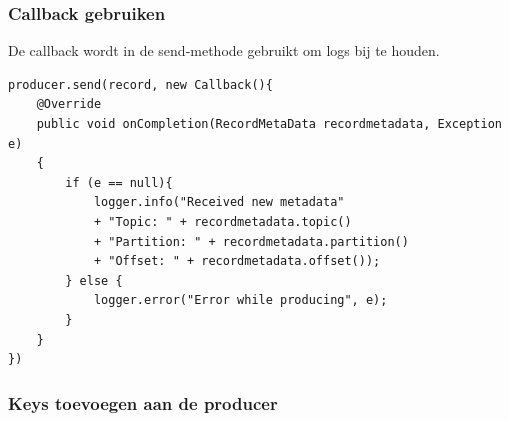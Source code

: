 \documentclass[a4paper,10pt,twoside]{report}
\begin{document}
\subsubsection{Callback gebruiken}

De callback wordt in de send-methode gebruikt om logs bij te houden.

\begin{lstlisting}
producer.send(record, new Callback(){
	@Override
	public void onCompletion(RecordMetaData recordmetadata, Exception e)
	{
		if (e == null){
			logger.info("Received new metadata"
			+ "Topic: " + recordmetadata.topic()
			+ "Partition: " + recordmetadata.partition()
			+ "Offset: " + recordmetadata.offset());	
		} else {
			logger.error("Error while producing", e);
		}
	}
})
\end{lstlisting}

\subsubsection{Keys toevoegen aan de producer}
\begin{lstlisting}

\end{lstlisting}
\end{document}
